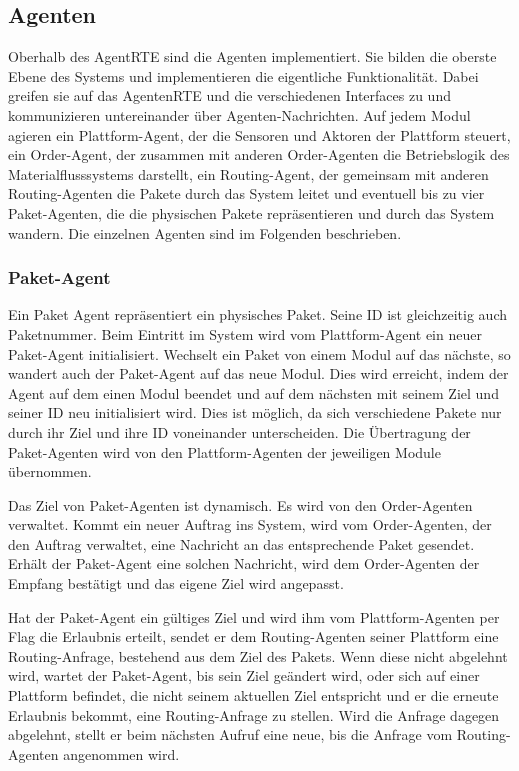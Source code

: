 \subsection{Agenten}
Oberhalb des AgentRTE sind die Agenten implementiert. Sie bilden die oberste Ebene des Systems und implementieren die eigentliche Funktionalität. Dabei greifen sie auf das AgentenRTE und die verschiedenen Interfaces zu und kommunizieren untereinander über Agenten-Nachrichten. Auf jedem Modul agieren ein Plattform-Agent, der die Sensoren und Aktoren der Plattform steuert, ein Order-Agent, der zusammen mit anderen Order-Agenten die Betriebslogik des Materialflusssystems darstellt, ein Routing-Agent, der gemeinsam mit anderen Routing-Agenten die Pakete durch das System leitet und eventuell bis zu vier Paket-Agenten, die die physischen Pakete repräsentieren und durch das System wandern. Die einzelnen Agenten sind im Folgenden beschrieben.
\subsubsection{Paket-Agent}
Ein Paket Agent repräsentiert ein physisches Paket. Seine ID ist gleichzeitig auch Paketnummer. Beim Eintritt im System wird vom Plattform-Agent ein neuer Paket-Agent initialisiert. Wechselt ein Paket von einem Modul auf das nächste, so wandert auch der Paket-Agent auf das neue Modul. Dies wird erreicht, indem der Agent auf dem einen Modul beendet und auf dem nächsten mit seinem Ziel und seiner ID neu initialisiert wird. Dies ist möglich, da sich verschiedene Pakete nur durch ihr Ziel und ihre ID voneinander unterscheiden. Die Übertragung der Paket-Agenten wird von den Plattform-Agenten der jeweiligen Module übernommen.

Das Ziel von Paket-Agenten ist dynamisch. Es wird von den Order-Agenten verwaltet. Kommt ein neuer Auftrag ins System, wird vom Order-Agenten, der den Auftrag verwaltet, eine Nachricht an das entsprechende Paket gesendet. Erhält der Paket-Agent eine solchen Nachricht, wird dem Order-Agenten der Empfang bestätigt und das eigene Ziel wird angepasst.

Hat der Paket-Agent ein gültiges Ziel und wird ihm vom Plattform-Agenten per Flag die Erlaubnis erteilt, sendet er dem Routing-Agenten seiner Plattform eine Routing-Anfrage, bestehend aus dem Ziel des Pakets. Wenn diese nicht abgelehnt wird, wartet der Paket-Agent, bis sein Ziel geändert wird, oder sich auf einer Plattform befindet, die nicht seinem aktuellen Ziel entspricht und er die erneute Erlaubnis bekommt, eine Routing-Anfrage zu stellen. Wird die Anfrage dagegen abgelehnt, stellt er beim nächsten Aufruf eine neue, bis die Anfrage vom Routing-Agenten angenommen wird.

